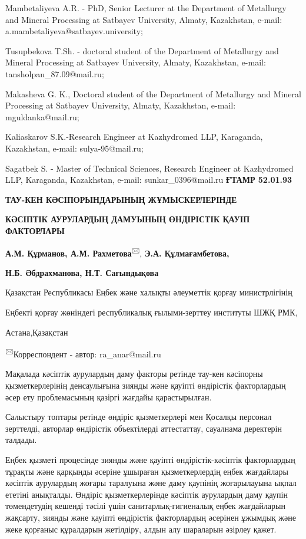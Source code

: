 Mambetaliyeva A.R. - PhD, Senior Lecturer at the Department of
Metallurgy and Mineral Processing at Satbayev University, Almaty,
Kazakhstan, e-mail: a.mambetaliyeva@satbayev.university;

Tusupbekova T.Sh. - doctoral student of the Department of Metallurgy and
Mineral Processing at Satbayev University, Almaty, Kazakhstan, e-mail:
tansholpan\_87.09@mail.ru;

Makasheva G. K., Doctoral student of the Department of Metallurgy and
Mineral Processing at Satbayev University, Almaty, Kazakhstan, e-mail:
mguldanka@mail.ru;

Kaliaskarov S.K.-Research Engineer at Kazhydromed LLP, Karaganda,
Kazakhstan, e-mail: sulya-95@mail.ru;

Sagatbek S. - Master of Technical Sciences, Research Engineer at
Kazhydromed LLP, Karaganda, Kazakhstan, e-mail: sunkar\_0396@mail.ru\newpage
{\bfseries ҒТАМР 52.01.93}

{\bfseries ТАУ-КЕН КӘСІПОРЫНДАРЫНЫҢ ЖҰМЫСКЕРЛЕРІНДЕ}

{\bfseries КӘСІПТІК АУРУЛАРДЫҢ ДАМУЫНЫҢ ӨНДІРІСТІК ҚАУІП ФАКТОРЛАРЫ}

{\bfseries А.М. Құрманов, А.М. Рахметова}\textsuperscript{🖂}, {\bfseries Э.А.
Құлмағамбетова,}

{\bfseries Н.Б. Әбдрахманова, Н.Т. Сағындықова}

Қазақстан Республикасы Еңбек және халықты әлеуметтік қорғау
министрлігінің

Еңбекті қорғау жөніндегі республикалық ғылыми-зерттеу институты ШЖҚ РМК,

Астана,Қазақстан

\textsuperscript{🖂}Корреспондент - автор: ra\_anar@mail.ru

Мақалада кәсіптік аурулардың даму факторы ретінде тау-кен кәсіпорны
қызметкерлерінің денсаулығына зиянды және қауіпті өндірістік
факторлардың әсер ету проблемасының қазіргі жағдайы қарастырылған.

Салыстыру топтары ретінде өндіріс қызметкерлері мен Қосалқы персонал
зерттелді, авторлар өндірістік объектілерді аттестаттау, сауалнама
деректерін талдады.

Еңбек қызметі процесінде зиянды және қауіпті өндірістік-кәсіптік
факторлардың тұрақты және қарқынды әсеріне ұшыраған қызметкерлердің
еңбек жағдайлары кәсіптік аурулардың жоғары таралуына және даму қаупінің
жоғарылауына ықпал ететіні анықталды. Өндіріс қызметкерлерінде кәсіптік
аурулардың даму қаупін төмендетудің кешенді тәсілі үшін
санитарлық-гигиеналық еңбек жағдайларын жақсарту, зиянды және қауіпті
өндірістік факторлардың әсерінен ұжымдық және жеке қорғаныс құралдарын
жетілдіру, алдын алу шараларын әзірлеу қажет.

